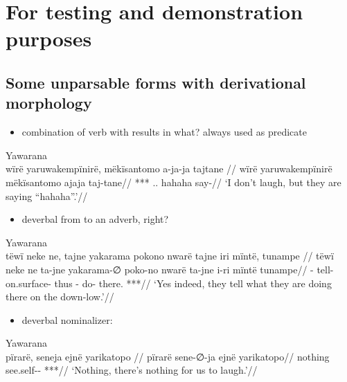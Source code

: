 \documentclass{memoir}
\begin{document}
\chapter{For testing and demonstration purposes}

\section{Some unparsable forms with derivational morphology}

\begin{itemize}
\tightlist
\item
  combination of verb with  results in what? always used
  as predicate
\end{itemize}

\ex Yawarana \\
\label{convrisamaj-07}    \begingl
    \glpreamble  wïrë yaruwakempïnirë, mëkïsantomo a-ja-ja tajtane //
    \gla wïrë yaruwakempïnirë mëkïsantomo ajaja taj-tane//
    \glb {} *** .. hahaha say-//
        \glft ‘I don’t laugh, but they are saying “hahaha”.’//  
    \endgl 
\xe

\begin{itemize}
\tightlist
\item
  deverbal from  to an adverb, right?
\end{itemize}

\ex Yawarana \\
\label{convrisamaj-09}    \begingl
    \glpreamble  tëwï neke ne, tajne yakarama pokono nwarë tajne iri mïntë, tunampe //
    \gla tëwï neke ne ta-jne yakarama-∅ poko-no nwarë ta-jne i-ri mïntë tunampe//
    \glb {}   - tell- on.surface- thus - do- there. ***//
        \glft ‘Yes indeed, they tell what they are doing there on the down-low.’//  
    \endgl 
\xe

\begin{itemize}
\tightlist
\item
  deverbal nominalizer:
\end{itemize}

\ex Yawarana \\
\label{convrisamaj-13}    \begingl
    \glpreamble  pïrarë, seneja ejnë yarikatopo //
    \gla pïrarë sene-∅-ja ejnë yarikatopo//
    \glb nothing see.self--  ***//
        \glft ‘Nothing, there’s nothing for us to laugh.’//  
    \endgl 
\xe
\end{document}
